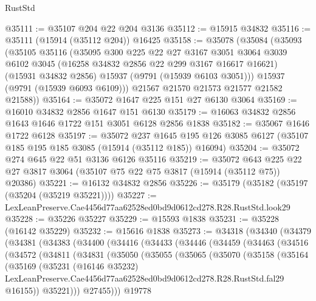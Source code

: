 \begin{lexlean}{RustStd}
\begin{coremodule}
@35111 := @35107 @204 @22 @204 @3136
@35112 := @15915 @34832
@35116 := @35111 (@15914 (@35112 @204)) @16425
@35158 := @35078
    (@35084
      (@35093
        (@35105
          @35116
          (@35095
            @300
            @225
            @22
            @27
            @3167
            @3051
            @3064
            @3039
            @6102
            @3045
            (@16258 @34832 @2856 @22 @299 @3167 @16617 @16621)
            (@15931 @34832 @2856)
            @15937
            (@9791 (@15939 @6103 @3051)))
          @15937
          (@9791 (@15939 @6093 @6109)))
        @21567
        @21570
        @21573
        @21577
        @21582
        @21588))
@35164 := @35072 @1647 @225 @151 @27 @6130 @3064
@35169 := @16010 @34832 @2856 @1647 @151 @6130
@35179 := @16063 @34832 @2856 @1643 @1646 @1722 @151 @3051 @6128 @2856 @1838
@35182 := @35067 @1646 @1722 @6128
@35197 := @35072
    @237
    @1645
    @195
    @126
    @3085
    @6127
    (@35107 @185 @195 @185 @3085 (@15914 (@35112 @185)) @16094)
@35204 := @35072 @274 @645 @22 @51 @3136 @6126 @35116
@35219 := @35072
    @643
    @225
    @22
    @27
    @3817
    @3064
    (@35107 @75 @22 @75 @3817 (@15914 (@35112 @75)) @20386)
@35221 := @16132 @34832 @2856
@35226 := @35179 (@35182 (@35197 (@35204 (@35219 @35221))))
@35227 := LexLeanPreserve.Cae4456d77aa62528ed0bd9d0612cd278.R28.RustStd.look29
@35228 := @35226 @35227
@35229 := @15593 @1838
@35231 := @35228 (@16142 @35229)
@35232 := @15616 @1838
@35273 := @34318
    (@34340
      (@34379
        (@34381
          (@34383
            (@34400
              (@34416
                (@34433
                  (@34446
                    (@34459
                      (@34463
                        (@34516
                          (@34572
                            (@34811
                              (@34831
                                (@35050
                                  (@35055
                                    (@35065
                                      (@35070
                                        (@35158
                                          (@35164
                                            (@35169
                                              (@35231
                                                (@16146 @35232)
                                                LexLeanPreserve.Cae4456d77aa62528ed0bd9d0612cd278.R28.RustStd.fal29
                                                @16155))
                                            @35221)))
                                      @27455)))
                                @19778

\end{coremodule}
\end{lexlean}
